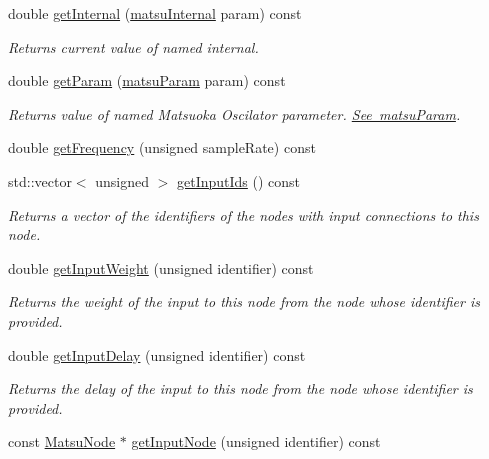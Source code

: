 \begin{DoxyCompactItemize}
double \mbox{\hyperlink{classMatsuNode_a64c0041dc1101a030f2d4f83468592fa}{get\+Internal}} (\mbox{\hyperlink{classMatsuNode_a5899aeb63b46cd45b1dc825ad518289a}{matsu\+Internal}} param) const
\begin{DoxyCompactList}\small\item\em Returns current value of named internal. \end{DoxyCompactList}\item 
double \mbox{\hyperlink{classMatsuNode_ad2e3306938c413010f706c96ab9a7653}{get\+Param}} (\mbox{\hyperlink{classMatsuNode_aed801e1d0363292efc99bb02f1911386}{matsu\+Param}} param) const
\begin{DoxyCompactList}\small\item\em Returns value of named Matsuoka Oscilator parameter. \mbox{\hyperlink{classMatsuNode_aed801e1d0363292efc99bb02f1911386}{See matsu\+Param}}. \end{DoxyCompactList}\item 
double \mbox{\hyperlink{classMatsuNode_af302351e0775abe90c5e2eb40a5a9035}{get\+Frequency}} (unsigned sample\+Rate) const
\item 
std\+::vector$<$ unsigned $>$ \mbox{\hyperlink{classMatsuNode_a79c07be1208645ebf5b18677afc47c9f}{get\+Input\+Ids}} () const
\begin{DoxyCompactList}\small\item\em Returns a vector of the identifiers of the nodes with input connections to this node. \end{DoxyCompactList}\item 
double \mbox{\hyperlink{classMatsuNode_ab6453259b47395fc6f32ccb35c130fd5}{get\+Input\+Weight}} (unsigned identifier) const
\begin{DoxyCompactList}\small\item\em Returns the weight of the input to this node from the node whose identifier is provided. \end{DoxyCompactList}\item 
double \mbox{\hyperlink{classMatsuNode_a834a92cc0cb855666c9df1a679f461e4}{get\+Input\+Delay}} (unsigned identifier) const
\begin{DoxyCompactList}\small\item\em Returns the delay of the input to this node from the node whose identifier is provided. \end{DoxyCompactList}\item 
const \mbox{\hyperlink{classMatsuNode}{Matsu\+Node}} $\ast$ \mbox{\hyperlink{classMatsuNode_a4669072fc04e1bcfc8561c52af04abbf}{get\+Input\+Node}} (unsigned identifier) const

\end{DoxyCompactItemize}
